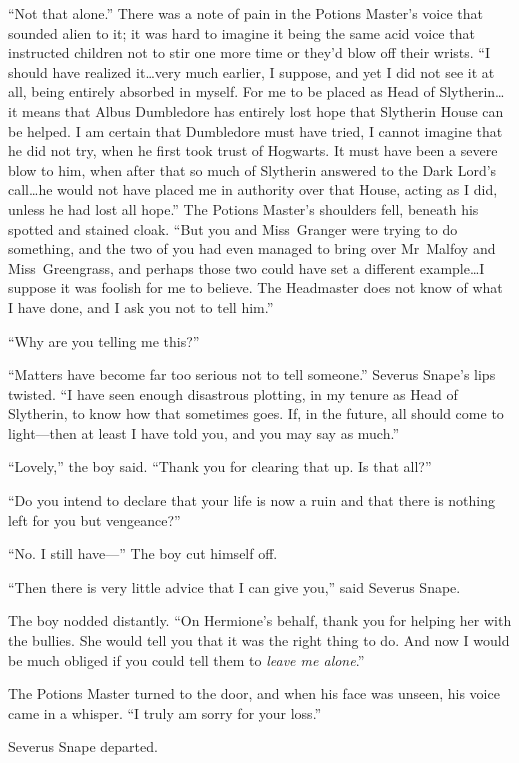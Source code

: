 “Not that alone.” There was a note of pain in the Potions Master’s voice that sounded alien to it; it was hard to imagine it being the same acid voice that instructed children not to stir one more time or they’d blow off their wrists. “I should have realized it…very much earlier, I suppose, and yet I did not see it at all, being entirely absorbed in myself. For me to be placed as Head of Slytherin…it means that Albus Dumbledore has entirely lost hope that Slytherin House can be helped. I am certain that Dumbledore must have tried, I cannot imagine that he did not try, when he first took trust of Hogwarts. It must have been a severe blow to him, when after that so much of Slytherin answered to the Dark Lord’s call…he would not have placed me in authority over that House, acting as I did, unless he had lost all hope.” The Potions Master’s shoulders fell, beneath his spotted and stained cloak. “But you and Miss~Granger were trying to do something, and the two of you had even managed to bring over Mr~Malfoy and Miss~Greengrass, and perhaps those two could have set a different example…I suppose it was foolish for me to believe. The Headmaster does not know of what I have done, and I ask you not to tell him.”

“Why are you telling me this?”

“Matters have become far too serious not to tell someone.” Severus Snape’s lips twisted. “I have seen enough disastrous plotting, in my tenure as Head of Slytherin, to know how that sometimes goes. If, in the future, all should come to light—then at least I have told you, and you may say as much.”

“Lovely,” the boy said. “Thank you for clearing that up. Is that all?”

“Do you intend to declare that your life is now a ruin and that there is nothing left for you but vengeance?”

“No. I still have—” The boy cut himself off.

“Then there is very little advice that I can give you,” said Severus Snape.

The boy nodded distantly. “On Hermione’s behalf, thank you for helping her with the bullies. She would tell you that it was the right thing to do. And now I would be much obliged if you could tell them to \emph{leave me alone}.”

The Potions Master turned to the door, and when his face was unseen, his voice came in a whisper. “I truly am sorry for your loss.”

Severus Snape departed.

